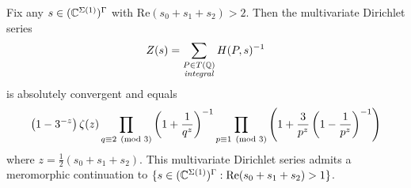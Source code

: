 \begin{theorem}

\label{thm:heightZetaFunctionFormula2}


\leanok



 Fix any $s \in (\mathbb{C}^{\Sigma(1)})^{\Gamma}$ with $\mathrm{Re}(s_0+s_1+s_2) > 2$. Then the multivariate Dirichlet series \begin{equation*} Z(s)= \sum_{\substack{P \in T(\mathbb Q)\\\text{\emph{integral}}}} H(P,s)^{-1} \end{equation*} is absolutely convergent and equals \begin{align*} \left({1-3^{-z}}\right) \zeta(z) \prod_{q\equiv2\pmod{3}} \left(1+\frac{1}{q^{z}}\right)^{-1} \prod_{p\equiv1\pmod{3}} \left(1+\frac{3}{p^z}\left(1-\frac{1}{p^z}\right)^{-1}\right) \end{align*} where $z = \frac{1}{2}(s_0+s_1+s_2)$. This multivariate Dirichlet series admits a meromorphic continuation to $\{s \in (\mathbb{C}^{\Sigma(1)})^{\Gamma} : \mathrm{Re}(s_0+s_1+s_2) > 1\}$. 

\end{theorem}

